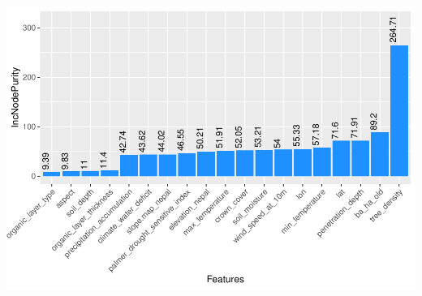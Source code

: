 \documentclass[
]{article}
\begin{document}
\includegraphics{feature_selection_report_files/figure-latex/unnamed-chunk-11-1.pdf}
\end{document}
